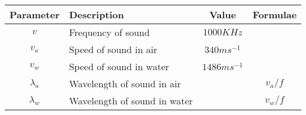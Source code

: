 \begin{tabular}{|c|p{2cm}|c|c|}
\hline 
\textbf{Parameter}  &\textbf{Description} &\textbf{Value} &\textbf{Formulae} \\
\hline
$v$ & Frequency of sound &$1000KHz$  &\\
\hline
$v_a$ & Speed of sound in air &$340 ms^{-1}$ &\\
\hline
$v_w $ & Speed of sound in water &$ 1486 ms^{-1}$ & \\ 
\hline
$\lambda_a$& Wavelength of sound in air & & $v_a/f$\\
\hline
$\lambda_w$ & Wavelength of sound in water&  & $v_w/f$ \\
\hline
\end{tabular}
